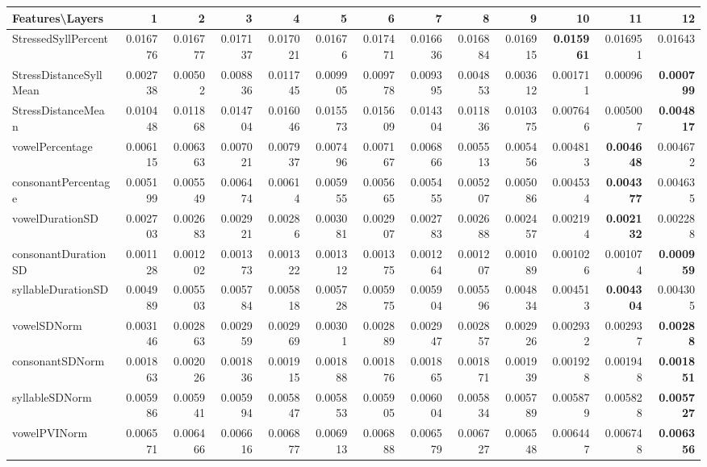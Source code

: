 \documentclass[sigconf]{acmart}
\begin{document}
\begin{table*}[]
\begin{adjustbox}{width=1\textwidth}
\begin{tabular}{@{}l|rrrrrrrrrrrr@{}}
\toprule
\textbf{Features\textbackslash{}Layers} & 1 & 2 & 3 & 4 & 5 & 6 & 7 & 8 & 9 & 10 & 11 & 12 \\ \midrule
StressedSyllPercent & 0.016776 & 0.016777 & 0.017137 & 0.017021 & 0.01676 & 0.017471 & 0.016636 & 0.016884 & 0.016915 & \textbf{0.015961} & 0.016951 & 0.01643 \\
StressDistanceSyllMean & 0.002738 & 0.00502 & 0.008836 & 0.011745 & 0.009905 & 0.009778 & 0.009395 & 0.004853 & 0.003612 & 0.001711 & 0.00096 & \textbf{0.000799} \\
StressDistanceMean & 0.010448 & 0.011868 & 0.014704 & 0.016046 & 0.015573 & 0.015609 & 0.014304 & 0.011836 & 0.010375 & 0.007646 & 0.005007 & \textbf{0.004817} \\
vowelPercentage & 0.006115 & 0.006363 & 0.007021 & 0.007937 & 0.007496 & 0.007167 & 0.006866 & 0.005513 & 0.005456 & 0.004813 & \textbf{0.004648} & 0.004672 \\
consonantPercentage & 0.005199 & 0.005549 & 0.006474 & 0.00614 & 0.005955 & 0.005665 & 0.005455 & 0.005207 & 0.005086 & 0.004534 & \textbf{0.004377} & 0.004635 \\
vowelDurationSD & 0.002703 & 0.002683 & 0.002921 & 0.00286 & 0.003081 & 0.002907 & 0.002783 & 0.002688 & 0.002457 & 0.002194 & \textbf{0.002132} & 0.002288 \\
consonantDurationSD & 0.001128 & 0.001202 & 0.001373 & 0.001322 & 0.001312 & 0.001375 & 0.001264 & 0.001207 & 0.001089 & 0.001026 & 0.001074 & \textbf{0.000959} \\
syllableDurationSD & 0.004989 & 0.005503 & 0.005784 & 0.005818 & 0.005728 & 0.005975 & 0.005904 & 0.005596 & 0.004834 & 0.004513 & \textbf{0.004304} & 0.004305 \\
vowelSDNorm & 0.003146 & 0.002863 & 0.002959 & 0.002969 & 0.00301 & 0.002889 & 0.002947 & 0.002857 & 0.002926 & 0.002932 & 0.002937 & \textbf{0.00288} \\
consonantSDNorm & 0.001863 & 0.002026 & 0.001836 & 0.001915 & 0.001888 & 0.001876 & 0.001865 & 0.001871 & 0.001939 & 0.001928 & 0.001948 & \textbf{0.001851} \\
syllableSDNorm & 0.005986 & 0.005941 & 0.005994 & 0.005847 & 0.005853 & 0.005905 & 0.006004 & 0.005834 & 0.005789 & 0.005879 & 0.005828 & \textbf{0.005727} \\
vowelPVINorm & 0.006571 & 0.006466 & 0.006616 & 0.006877 & 0.006913 & 0.006888 & 0.006579 & 0.006727 & 0.006548 & 0.006447 & 0.006748 & \textbf{0.006356} \\

\end{tabular}
\end{adjustbox}
\end{table*}
\end{document}
